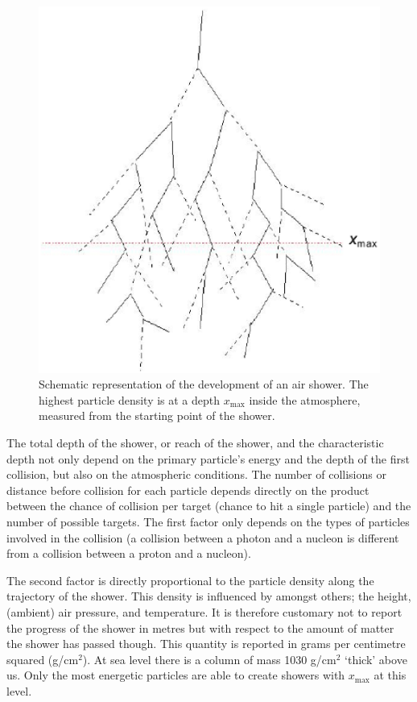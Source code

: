\documentclass[12pt,a4paper]{article}
\numberwithin{equation}{section}
\numberwithin{figure}{section}
\numberwithin{table}{section}
\begin{document}
\begin{figure}\begin{center}
\includegraphics[scale=0.5]{x_max.eps}%
\caption{Schematic representation of the development of an air shower. The highest particle density is at a depth $x_{\mbox{max}}$ inside the atmosphere, measured from the starting point of the shower.}\label{fig:x_max}
\end{center}\end{figure}

The total depth of the shower, or reach of the shower, and the characteristic depth not only depend on the primary particle's energy and the depth of the first collision, but also on the atmospheric conditions. The number of collisions or distance before collision for each particle depends directly on the product between the chance of collision per target (chance to hit a single particle) and the number of possible targets. The first factor only depends on the types of particles involved in the collision (a collision between a photon and a nucleon is different from a collision between a proton and a nucleon).

The second factor is directly proportional to the particle density along the trajectory of the shower. This density is influenced by amongst others; the height, (ambient) air pressure, and temperature. It is therefore customary not to report the progress of the shower in metres but with respect to the amount of matter the shower has passed though. This quantity is reported in grams per centimetre squared (g/cm$^2$). At sea level there is a column of mass 1030 g/cm$^2$ `thick' above us. Only the most energetic particles are able to create showers with $x_{\mbox{max}}$ at this level.
\end{document}
